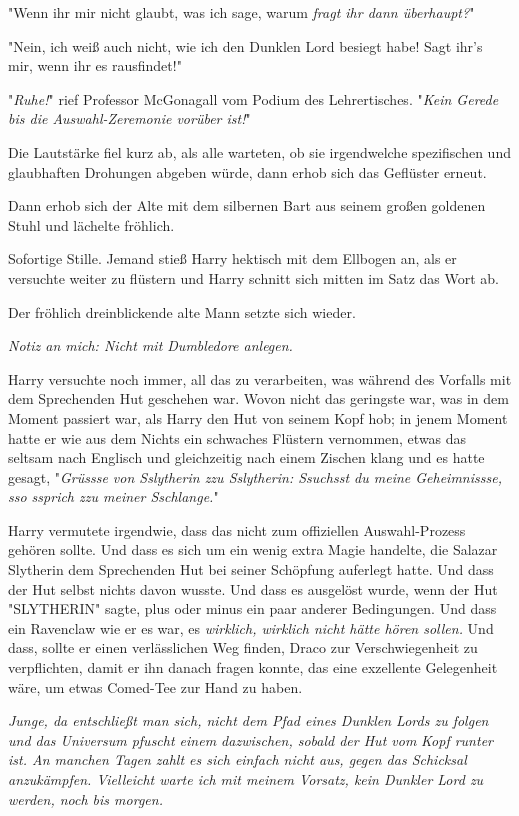 {"Wenn ihr mir nicht glaubt, was ich sage, warum \emph{fragt ihr dann überhaupt?}"

"Nein, ich weiß auch nicht, wie ich den Dunklen Lord besiegt habe! Sagt ihr's mir, wenn ihr es rausfindet!"

"\emph{Ruhe!}" rief Professor McGonagall vom Podium des Lehrertisches. "\emph{Kein Gerede bis die Auswahl-Zeremonie vorüber ist!}"

Die Lautstärke fiel kurz ab, als alle warteten, ob sie irgendwelche spezifischen und glaubhaften Drohungen abgeben würde, dann erhob sich das Geflüster erneut.

Dann erhob sich der Alte mit dem silbernen Bart aus seinem großen goldenen Stuhl und lächelte fröhlich.

Sofortige Stille. Jemand stieß Harry hektisch mit dem Ellbogen an, als er versuchte weiter zu flüstern und Harry schnitt sich mitten im Satz das Wort ab.

Der fröhlich dreinblickende alte Mann setzte sich wieder.

\emph{Notiz an mich: Nicht mit Dumbledore anlegen.}

Harry versuchte noch immer, all das zu verarbeiten, was während des Vorfalls mit dem Sprechenden Hut geschehen war. Wovon nicht das geringste war, was in dem Moment passiert war, als Harry den Hut von seinem Kopf hob; in jenem Moment hatte er wie aus dem Nichts ein schwaches Flüstern vernommen, etwas das seltsam nach Englisch und gleichzeitig nach einem Zischen klang und es hatte gesagt, "\emph{Grüssse von Sslytherin zzu Sslytherin: Ssuchsst du meine Geheimnissse, sso ssprich zzu meiner Sschlange.}"

Harry vermutete irgendwie, dass das nicht zum offiziellen Auswahl-Prozess gehören sollte. Und dass es sich um ein wenig extra Magie handelte, die Salazar Slytherin dem Sprechenden Hut bei seiner Schöpfung auferlegt hatte. Und dass der Hut selbst nichts davon wusste. Und dass es ausgelöst wurde, wenn der Hut "SLYTHERIN" sagte, plus oder minus ein paar anderer Bedingungen. Und dass ein Ravenclaw wie er es war, es \emph{wirklich, wirklich nicht hätte hören sollen.} Und dass, sollte er einen verlässlichen Weg finden, Draco zur Verschwiegenheit zu verpflichten, damit er ihn danach fragen konnte, das eine exzellente Gelegenheit wäre, um etwas Comed-Tee zur Hand zu haben.

\emph{Junge, da entschließt man sich, nicht dem Pfad eines Dunklen Lords zu folgen und das Universum pfuscht einem dazwischen, sobald der Hut vom} \emph{Kopf runter ist. An manchen Tagen zahlt es sich einfach nicht aus, gegen das Schicksal anzukämpfen. Vielleicht warte ich mit meinem Vorsatz, kein Dunkler Lord zu werden, noch bis morgen.}

}
